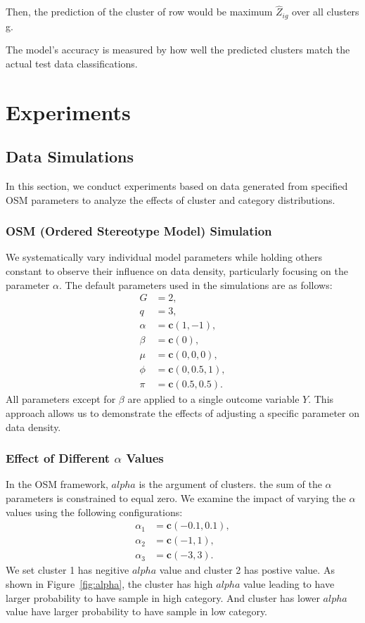 \documentclass{article}
\begin{document}
Then, the prediction of the cluster of row would be maximum $\hat{Z}_{ig}$ over all clusters g.

The model's accuracy is measured by how well the predicted clusters match the actual test data classifications.

\section{Experiments}

\subsection{Data Simulations}

In this section, we conduct experiments based on data generated from specified OSM parameters to analyze the effects of cluster and category distributions.

\subsubsection{OSM (Ordered Stereotype Model) Simulation}
We systematically vary individual model parameters while holding others constant to observe their influence on data density, particularly focusing on the parameter $\alpha$. The default parameters used in the simulations are as follows:
\[
\begin{aligned}
G &= 2, \\
q &= 3, \\
\alpha &= \mathbf{c}(1, -1), \\
\beta &= \mathbf{c}(0), \\
\mu &= \mathbf{c}(0, 0, 0), \\
\phi &= \mathbf{c}(0, 0.5, 1), \\
\pi &= \mathbf{c}(0.5, 0.5).
\end{aligned}
\]
All parameters except for $\beta$ are applied to a single outcome variable $Y$. This approach allows us to demonstrate the effects of adjusting a specific parameter on data density.

\subsubsection*{Effect of Different $\alpha$ Values}
In the OSM framework, $alpha$ is the argument of clusters. the sum of the $\alpha$ parameters is constrained to equal zero. 
We examine the impact of varying the $\alpha$ values using the following configurations:
\[
\begin{aligned}
\alpha_1 &= \mathbf{c}(-0.1, 0.1), \\
\alpha_2 &= \mathbf{c}(-1, 1), \\
\alpha_3 &= \mathbf{c}(-3, 3).
\end{aligned}
\]
We set cluster 1 has negitive $alpha$ value and cluster 2 has postive value.
As shown in Figure~\ref{fig:alpha}, 
the cluster has high $alpha$ value leading to have larger probability to have sample in high category.
And cluster has lower $alpha$ value have larger probability to have sample in low category.
\end{document}
